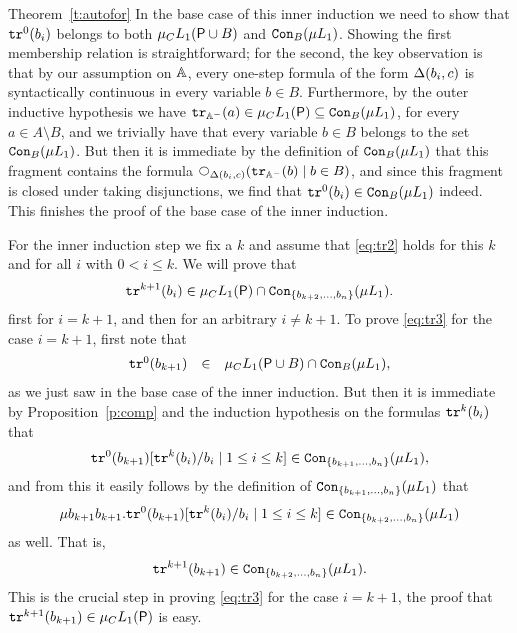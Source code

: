 \begin{proofof}{Theorem~\ref{t:autofor}}
In the base case of this inner induction we need to show that $\mathtt{tr}^{0}(b_{i})$ 
belongs to both $\mu_{C}L_{1}(\mathsf{P} \cup B)$ and $\mathtt{Con}_{B}(\mu L_{1})$.
Showing the first membership relation is straightforward; for the second, the 
key observation is that by our assumption on $\mathbb{A}$, every one-step formula of
the form $\Delta(b_{i},c)$ is syntactically continuous in every variable $b \in 
B$.
Furthermore, by the outer inductive hypothesis we have $\mathtt{tr}_{\mathbb{A}^{-}}(a) \in
\mu_{C}L_{1}(\mathsf{P}) \subseteq \mathtt{Con}_{B}(\mu L_{1})$,
for every $a \in A \setminus B$, and we trivially have that every variable $b 
\in B$ belongs to the set $\mathtt{Con}_{B}(\mu L_{1})$.
But then it is immediate by the definition of $\mathtt{Con}_{B}(\mu L_{1})$ that 
this fragment contains the formula $\nxt{\tmap(b_{i},c)}(\ytr_{\bbA^{-}}(b)
\mid b \in B)$, and since this fragment is closed under taking disjunctions, 
we find that $\mathtt{tr}^{0}(b_{i}) \in \mathtt{Con}_{B}(\mu L_{1})$ indeed.
This finishes the proof of the base case of the inner induction.

For the inner induction step we fix a $k$ and assume that
\eqref{eq:tr2} holds for this $k$ and for all $i$ with $0 < i \leq k$.
We will prove that
\begin{equation}
\label{eq:tr3}
\ytr^{k+1}(b_{i}) \in \mu_{C}\oslang(\pprop) \cap 
    \cont{\mu\oslang}{\{ b_{k+2},\ldots,b_{n}\}}.
\end{equation}
first for $i = k+1$, and then for an arbitrary $i \neq k+1$.
To prove \eqref{eq:tr3} for the case $i = k+1$, first note that
\[\begin{array}{lcl}
\mathtt{tr}^{0}(b_{k+1}) &\in& \mu_{C}L_{1}(\mathsf{P}\cup B) 
   \cap \mathtt{Con}_{B}(\mu L_{1}),
\end{array}\]
as we just saw in the base case of the inner induction.
But then it is immediate by Proposition~\ref{p:comp} and the induction 
hypothesis on the formulas $\mathtt{tr}^{k}(b_{i})$ that 
\[
\mathtt{tr}^{0}(b_{k+1})[\mathtt{tr}^{k}(b_{i})/b_{i} \mid 1 \leq i\leq k]
\in \mathtt{Con}_{\{ b_{k+1},\ldots,b_{n}\}}(\mu L_{1}),
\]
and from this it easily follows by the definition of 
$\mathtt{Con}_{\{ b_{k+1},\ldots,b_{n}\}}(\mu L_{1})$ that 
\[
\mu b_{k+1} b_{k+1}. \mathtt{tr}^{0}(b_{k+1})[\mathtt{tr}^{k}(b_{i})/b_{i} \mid 1 \leq i\leq k]
\in \mathtt{Con}_{\{ b_{k+2},\ldots,b_{n}\}}(\mu L_{1})
\]
as well. 
That is, 
\[
\mathtt{tr}^{k+1}(b_{k+1}) \in \mathtt{Con}_{\{ b_{k+2},\ldots,b_{n}\}}(\mu L_{1}).
\]
This is the crucial step in proving \eqref{eq:tr3} for the case $i=k+1$,
the proof that $\mathtt{tr}^{k+1}(b_{k+1}) \in \mu_{C}L_{1}(\mathsf{P})$ is easy.


\end{proofof}
